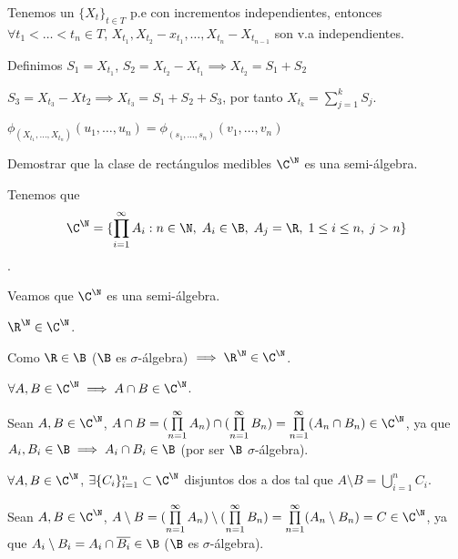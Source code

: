 \begin{sol}
  Tenemos un $\{X_t\}_{t \in T}$ p.e con incrementos independientes, entonces $\forall t_1 < \ldots < t_n \in T$, $X_{t_1}, X_{t_2} - x_{t_1}, \ldots, X_{t_n} - X_{t_{n-1}}$ son v.a independientes.

  Definimos $S_1 = X_{t_1}$, $S_2 = X_{t_2} - X_{t_1} \implies X_{t_2} = S_1 + S_2$

  $S_3 = X_{t_3} - X{t_2} \implies X_{t_3} = S_1 + S_2 + S_3$, por tanto $X_{t_k} = \sum \limits^k_{j = 1} S_j$.

  $\phi_{(X_{t_1}, \ldots, X_{t_n})}(u_1, \ldots, u_n) = \phi_{(s_1, \ldots, s_n)}(v_1, \ldots, v_n)$

\end{sol}

\begin{ejer}
  Demostrar que la clase de rectángulos medibles $\C^\N$ es una semi-álgebra.
\end{ejer}

\begin{sol}
  Tenemos que $$\C^\N = \{\prod \limits^\infty_{i = 1} A_i : n \in \N, \;A_i \in \B, \; A_{j} = \R, \; 1 \leq i \leq n, \; j > n\}$$.

  Veamos que $\C^\N$ es una semi-álgebra.
  \begin{nlist}
    \item $\R^\N \in \C^\N$.

    Como $\R \in \B$ ($\B$ es $\sigma$-álgebra) $\implies \R^\N \in \C^\N$.

    \item $\forall A, B \in \C^\N \implies A \cap B \in \C^\N$.

    Sean $A, B \in \C^\N$, $A \cap B = (\prod \limits^\infty_{n = 1} A_n) \cap (\prod \limits^\infty_{n = 1} B_n) = \prod \limits^\infty_{n = 1} (A_n \cap B_n) \in \C^\N$, ya que $A_i, B_i \in \B \implies A_i \cap B_i \in \B$ (por ser $\B$ $\sigma$-álgebra).

    \item $\forall A, B \in \C^\N$, $\exists \{C_i\}^n_{i = 1} \subset \C^\N$ disjuntos dos a dos tal que $A \setminus B = \bigcup \limits^n_{i = 1} C_i$.

    Sean $A, B \in \C^\N$, $A \setminus B = (\prod \limits^\infty_{n = 1} A_n) \setminus(\prod \limits^\infty_{n = 1} B_n) = \prod \limits^\infty_{n = 1} (A_n \setminus B_n) = C \in \C^\N$, ya que $A_i \setminus B_i = A_i \cap \overline{B_i} \in \B$ ($\B$ es $\sigma$-álgebra).
  \end{nlist}
\end{sol}

